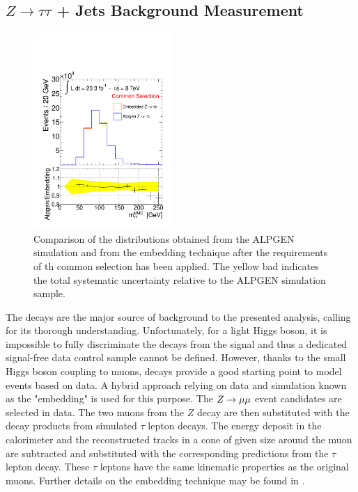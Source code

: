 \subsection{$Z \rightarrow \tau\tau$ + Jets Background Measurement}\label{sec:ztau}

\begin{figure}[tp]
     \begin{center}

            \includegraphics[page=1, width=0.47\textwidth]{figure/emb_plots.pdf}
\end{center}
    \caption{Comparison of the \mmc distributions obtained from the ALPGEN \Ztautau simulation and from the embedding technique after 
	the requirements of th common selection  has been applied. 
	The yellow bad indicates the total systematic uncertainty  relative to the ALPGEN simulation sample.}
   \label{fig:emb_vs_alp1}
\end{figure}

The  \Ztautau decays are the major source of  background to the presented  analysis,  calling for its thorough understanding.
Unfortunately, for a light Higgs boson, it is impossible to fully discriminate the  \Ztautau decays 
from the signal and thus a 
dedicated signal-free data control sample cannot be defined.
However, thanks to the small Higgs boson coupling to muons, \Zmumu decays provide a good starting point to 
model \Ztautau events based on data. A hybrid approach relying on data and simulation known as the "embedding" is used for this purpose.
The $Z\rightarrow \mu\mu$ event candidates are selected in data. The two muons from the $Z$ decay are then substituted with the decay 
products from simulated $\tau$ lepton decays. The energy deposit in the calorimeter and the reconstructed tracks 
in a cone of given size around the muon are subtracted
and substituted with the corresponding predictions from the $\tau$ lepton decay. These $\tau$ leptons  have the same kinematic properties
 as the original muons. Further details on the embedding technique may be found in \cite{Embedding, SMold}.


